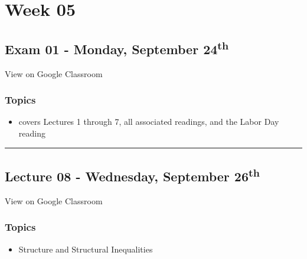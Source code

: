 \documentclass[]{book}
\providecommand{\tightlist}{%
  \setlength{\itemsep}{0pt}\setlength{\parskip}{0pt}}
\theoremstyle{definition}
\theoremstyle{definition}
\theoremstyle{definition}
\theoremstyle{remark}
\begin{document}
\hypertarget{week-05}{%
\section*{Week 05}\label{week-05}}

\hypertarget{exam-01---monday-september-24th}{%
\subsection*{\texorpdfstring{Exam 01 - Monday, September
24\textsuperscript{th}}{Exam 01 - Monday, September 24th}}\label{exam-01---monday-september-24th}}

View on Google Classroom

\hypertarget{topics-8}{%
\subsubsection*{Topics}\label{topics-8}}

\begin{itemize}
\tightlist
\item
  covers Lectures 1 through 7, all associated readings, and the Labor
  Day reading
\end{itemize}

\begin{center}\rule{0.5\linewidth}{\linethickness}\end{center}

\hypertarget{lecture-08---wednesday-september-26th}{%
\subsection*{\texorpdfstring{Lecture 08 - Wednesday, September
26\textsuperscript{th}}{Lecture 08 - Wednesday, September 26th}}\label{lecture-08---wednesday-september-26th}}

View on Google Classroom

\hypertarget{topics-9}{%
\subsubsection*{Topics}\label{topics-9}}

\begin{itemize}
\tightlist
\item
  Structure and Structural Inequalities
\end{itemize}
\end{document}
